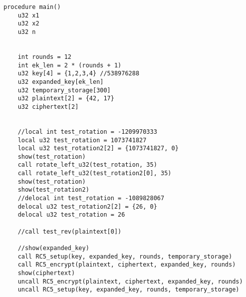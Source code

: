 \documentclass[a4paper,10pt,openright]{memoir}
\begin{document}
\begin{lstlisting}[language=Janus,breaklines=true]
procedure main()
    u32 x1
    u32 x2
    u32 n

    
    int rounds = 12
    int ek_len = 2 * (rounds + 1)
    u32 key[4] = {1,2,3,4} //538976288
    u32 expanded_key[ek_len]
    u32 temporary_storage[300]
    u32 plaintext[2] = {42, 17}
    u32 ciphertext[2]


    //local int test_rotation = -1209970333
    local u32 test_rotation = 1073741827
    local u32 test_rotation2[2] = {1073741827, 0}
    show(test_rotation)
    call rotate_left_u32(test_rotation, 35)
    call rotate_left_u32(test_rotation2[0], 35)
    show(test_rotation)
    show(test_rotation2)
    //delocal int test_rotation = -1089828067
    delocal u32 test_rotation2[2] = {26, 0}
    delocal u32 test_rotation = 26

    //call test_rev(plaintext[0])

    //show(expanded_key)
    call RC5_setup(key, expanded_key, rounds, temporary_storage)
    call RC5_encrypt(plaintext, ciphertext, expanded_key, rounds)
    show(ciphertext)
    uncall RC5_encrypt(plaintext, ciphertext, expanded_key, rounds)
    uncall RC5_setup(key, expanded_key, rounds, temporary_storage)
\end{lstlisting}
\end{document}
